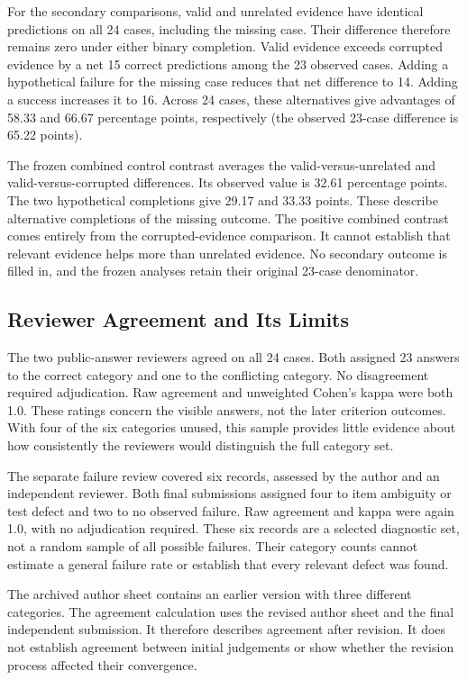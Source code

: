 For the secondary comparisons, valid and unrelated evidence have identical predictions on all 24 cases, including the missing
case. Their difference therefore remains zero under either binary completion. Valid evidence exceeds corrupted evidence by a
net 15 correct predictions among the 23 observed cases. Adding a hypothetical failure for the missing case reduces that net
difference to 14. Adding a success increases it to 16. Across 24 cases, these alternatives give advantages of 58.33 and
66.67 percentage points, respectively (the observed 23-case difference is 65.22 points).

The frozen combined control contrast averages the valid-versus-unrelated and valid-versus-corrupted differences. Its observed
value is 32.61 percentage points. The two hypothetical completions give 29.17 and 33.33 points. These describe alternative
completions of the missing outcome. The positive combined contrast comes entirely from the corrupted-evidence comparison.
It cannot establish that relevant evidence helps more than unrelated evidence. No secondary outcome is filled in, and the
frozen analyses retain their original 23-case denominator.

\subsection{Reviewer Agreement and Its Limits}

The two public-answer reviewers agreed on all 24 cases. Both assigned 23 answers to the correct category and one to the
conflicting category. No disagreement required adjudication. Raw agreement and unweighted Cohen's kappa were both 1.0.
These ratings concern the visible answers, not the later criterion outcomes. With four of the six categories unused, this
sample provides little evidence about how consistently the reviewers would distinguish the full category set.

The separate failure review covered six records, assessed by the author and an independent reviewer. Both final submissions assigned four to item ambiguity or test defect and
two to no observed failure. Raw agreement and kappa were again 1.0, with no adjudication required. These six records are a
selected diagnostic set, not a random sample of all possible failures. Their category counts cannot estimate a general failure
rate or establish that every relevant defect was found.

The archived author sheet contains an earlier version with three different categories. The agreement calculation uses the
revised author sheet and the final independent submission. It therefore describes agreement after revision. It does not
establish agreement between initial judgements or show whether the revision process affected their convergence.

